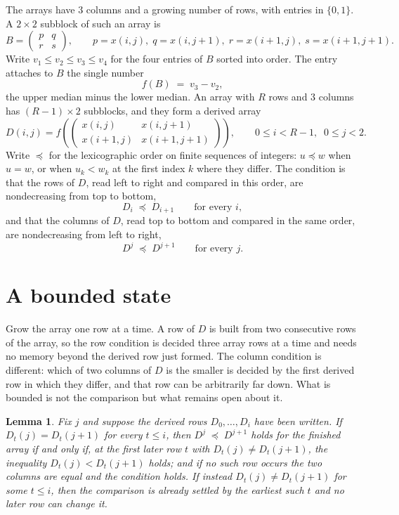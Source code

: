 \documentclass[11pt,a4paper]{article}
\theoremstyle{plain}
\newtheorem{lemma}[theorem]{Lemma}
\theoremstyle{definition}
\begin{document}
The arrays have $3$ columns and a growing number of rows, with entries in $\{0,1\}$. A
$2\times2$ subblock of such an array is
\[
B=\begin{pmatrix} p & q \\ r & s \end{pmatrix},
\qquad p=x(i,j),\; q=x(i,j+1),\; r=x(i+1,j),\; s=x(i+1,j+1).
\]
Write $v_1\le v_2\le v_3\le v_4$ for the four entries of $B$ sorted into order. The entry attaches to $B$ the single number
\[
f(B)\;=\;v_3-v_2,
\]
the upper median minus the lower median. An array with $R$ rows and $3$ columns has $(R-1)\times2$ subblocks, and they
form a derived array
\[
D(i,j)=f\!\left(\begin{pmatrix} x(i,j) & x(i,j+1) \\ x(i+1,j) & x(i+1,j+1)\end{pmatrix}
\right),\qquad 0\le i<R-1,\;\; 0\le j<2 .
\]
Write $\preceq$ for the lexicographic order on finite sequences of integers: $u\preceq w$ when
$u=w$, or when $u_k<w_k$ at the first index $k$ where they differ. The condition is that the
rows of $D$, read left to right and compared in this order, are nondecreasing from top to bottom,
\[
D_{i}\;\preceq\;D_{i+1}\qquad\text{for every } i,
\]
and that the columns of $D$, read top to bottom and compared in the same order, are nondecreasing
from left to right,
\[
D^{j}\;\preceq\;D^{j+1}\qquad\text{for every } j .
\]

\section{A bounded state}

Grow the array one row at a time. A row of $D$ is built from two consecutive rows of the array,
so the row condition is decided three array rows at a time and needs no memory beyond the
derived row just formed. The column condition is different: which of two columns of $D$ is the
smaller is decided by the first derived row in which they differ, and that row can be
arbitrarily far down. What is bounded is not the comparison but what remains open about it.

\begin{lemma}\label{lem:bits}
Fix $j$ and suppose the derived rows $D_0,\dots,D_i$ have been written. If $D_t(j)=D_t(j+1)$ for
every $t\le i$, then $D^{j}\;\preceq\;D^{j+1}$ holds for the finished array if and only if,
at the first later row $t$ with $D_t(j)\neq D_t(j+1)$, the inequality $D_t(j)<D_t(j+1)$
holds; and if no such row occurs the two columns are equal and the condition holds. If instead
$D_t(j)\neq D_t(j+1)$ for some $t\le i$, then the comparison is already settled by the earliest
such $t$ and no later row can change it.
\end{lemma}
\end{document}
